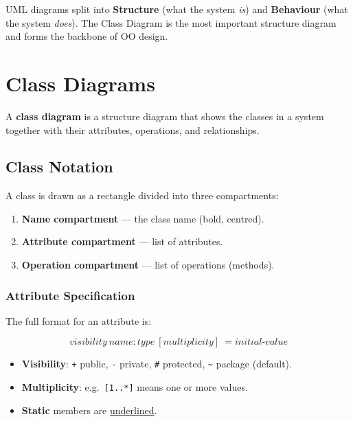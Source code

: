\documentclass[11pt, a4paper, notitlepage]{report}
\theoremstyle{definition}
\theoremstyle{remark}
\theoremstyle{definition}
\begin{document}
\begin{keyresult}[title={Key Result: UML Diagram Taxonomy}]
  UML diagrams split into \textbf{Structure} (what the system \emph{is}) and
  \textbf{Behaviour} (what the system \emph{does}).  The Class Diagram is the
  most important structure diagram and forms the backbone of OO design.
\end{keyresult}

\section{Class Diagrams}
\label{sec:ch6-class-diagram}

A \textbf{class diagram} is a structure diagram that shows the classes in a
system together with their attributes, operations, and relationships.

\subsection{Class Notation}
\label{subsec:ch6-class-notation}

A class is drawn as a rectangle divided into three compartments:

\begin{enumerate}
  \item \textbf{Name compartment} --- the class name (bold, centred).
  \item \textbf{Attribute compartment} --- list of attributes.
  \item \textbf{Operation compartment} --- list of operations (methods).
\end{enumerate}

\subsubsection{Attribute Specification}

The full format for an attribute is:

\[
  \textit{visibility}\ \textit{name} : \textit{type}\ [\textit{multiplicity}]\ = \textit{initial-value}
\]

\begin{itemize}[noitemsep]
  \item \textbf{Visibility}: \texttt{+} public, \texttt{-} private,
        \texttt{\#} protected, \texttt{\textasciitilde} package (default).
  \item \textbf{Multiplicity}: e.g.\ \texttt{[1..*]} means one or more
        values.
  \item \textbf{Static} members are \underline{underlined}.
\end{itemize}
\end{document}
